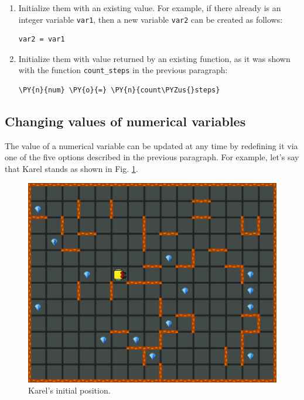 \begin{enumerate}
\noindent
\item Initialize them with an existing value. For example, if there already is an integer variable 
{\tt var1}, then a new variable {\tt var2} can be created as follows:\\

\begin{bboxshort}
\begin{Verbatim}[commandchars=\\\{\}]
var2 = var1
\end{Verbatim}
\end{bboxshort}
\vspace{1mm}

\noindent
\item Initialize them with value returned by an existing function, as it was shown 
with the function {\tt count\_steps} in the previous paragraph:\\

\begin{bbox}
\begin{Verbatim}[commandchars=\\\{\}]
\PY{n}{num} \PY{o}{=} \PY{n}{count\PYZus{}steps}
\end{Verbatim}
\end{bbox}
\end{enumerate}

\subsection[\ \ Changing values of numerical variables]{Changing values of numerical variables}

The value of a numerical variable can be updated at any time by redefining it via 
one of the five options described in the previous paragraph. For example, let's say that 
Karel stands as shown in Fig. \ref{fig:var1}.

\begin{figure}[!ht]
\begin{center}
\includegraphics[height=0.4\textwidth]{img/variables1.png}
\end{center}
\vspace{-4mm}
\caption{Karel's initial position.}
\label{fig:var1}
\end{figure}

